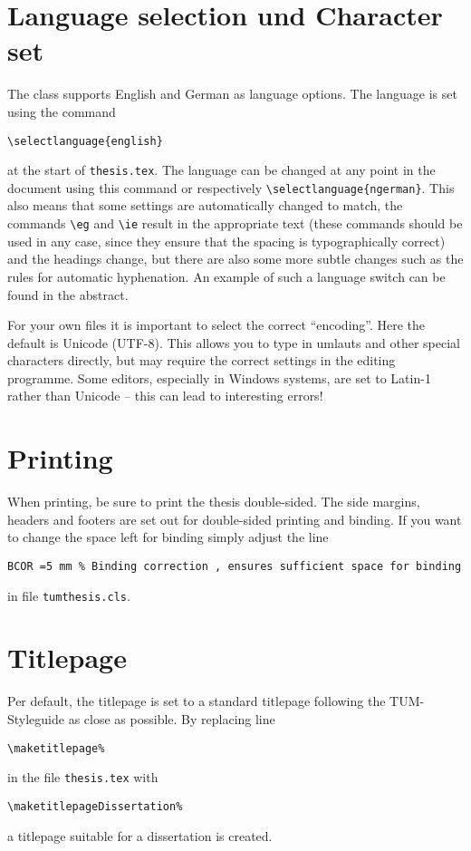 \section{Language selection und Character set}
\label{sec:intro:language}
The class supports English and German as language options. The language is set using the command
\begin{lstlisting}[language={[LaTeX]TeX}]
  \selectlanguage{english}
\end{lstlisting}
at the start of \texttt{thesis.tex}. The language can be changed at any point in the document using this command or respectively \verb|\selectlanguage{ngerman}|. This also means that some settings are automatically changed to match, \eg the commands \verb|\eg| and \verb|\ie| result in the appropriate text (these commands should be used in any case, since they ensure that the spacing is typographically correct) and the headings change, but there are also some more subtle changes such as the rules for automatic hyphenation. An example of such a language switch can be found in the abstract.



For your own files it is important to select the correct \enquote{encoding}. Here the default is Unicode (UTF-8). This allows you to type in umlauts and other special characters directly, but may require the correct settings in the editing programme. Some editors, especially in Windows systems, are set to Latin-1 rather than Unicode -- this can lead to interesting errors!


\section{Printing}
\label{sec:intro:binding}
When printing, be sure to print the thesis double-sided. The side margins, headers and footers are set out for double-sided printing and binding. If you want to change the space left for binding simply adjust the line
\begin{lstlisting}[language={[LaTeX]TeX}]
  BCOR =5 mm % Binding correction , ensures sufficient space for binding
\end{lstlisting}
in file \verb|tumthesis.cls|.

\section{Titlepage}
Per default, the titlepage is set to a standard titlepage following the TUM-Styleguide as close as possible. By replacing line
\begin{verbatim}
\maketitlepage%
\end{verbatim}
in the file \texttt{thesis.tex} with
\begin{verbatim}
\maketitlepageDissertation%
\end{verbatim}
a titlepage suitable for a dissertation is created.


